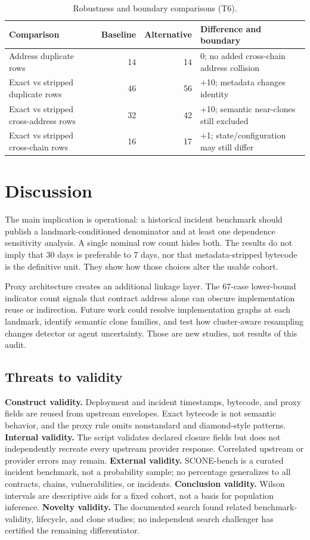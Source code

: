 \documentclass[10pt]{article}
\newcommand{\dataset}{SCONE-bench}
\begin{document}
\begin{table}[h]
\centering\small
\caption{Robustness and boundary comparisons (T6).}
\begin{tabularx}{\linewidth}{>{\raggedright\arraybackslash}p{3.0cm}rrX}
\toprule Comparison & Baseline & Alternative & Difference and boundary \\
\midrule
Address duplicate rows & 14 & 14 & 0; no added cross-chain address collision \\
Exact vs stripped duplicate rows & 46 & 56 & +10; metadata changes identity \\
Exact vs stripped cross-address rows & 32 & 42 & +10; semantic near-clones still excluded \\
Exact vs stripped cross-chain rows & 16 & 17 & +1; state/configuration may still differ \\
\bottomrule
\end{tabularx}
\end{table}

\section{Discussion}
The main implication is operational: a historical incident benchmark should publish a landmark-conditioned denominator and at least one dependence sensitivity analysis. A single nominal row count hides both. The results do not imply that 30 days is preferable to 7 days, nor that metadata-stripped bytecode is the definitive unit. They show how those choices alter the usable cohort.

Proxy architecture creates an additional linkage layer. The 67-case lower-bound indicator count signals that contract address alone can obscure implementation reuse or indirection. Future work could resolve implementation graphs at each landmark, identify semantic clone families, and test how cluster-aware resampling changes detector or agent uncertainty. Those are new studies, not results of this audit.

\subsection{Threats to validity}
\textbf{Construct validity.} Deployment and incident timestamps, bytecode, and proxy fields are reused from upstream envelopes. Exact bytecode is not semantic behavior, and the proxy rule omits nonstandard and diamond-style patterns. \textbf{Internal validity.} The script validates declared closure fields but does not independently recreate every upstream provider response. Correlated upstream or provider errors may remain. \textbf{External validity.} \dataset{} is a curated incident benchmark, not a probability sample; no percentage generalizes to all contracts, chains, vulnerabilities, or incidents. \textbf{Conclusion validity.} Wilson intervals are descriptive aids for a fixed cohort, not a basis for population inference. \textbf{Novelty validity.} The documented search found related benchmark-validity, lifecycle, and clone studies; no independent search challenger has certified the remaining differentiator.
\end{document}
